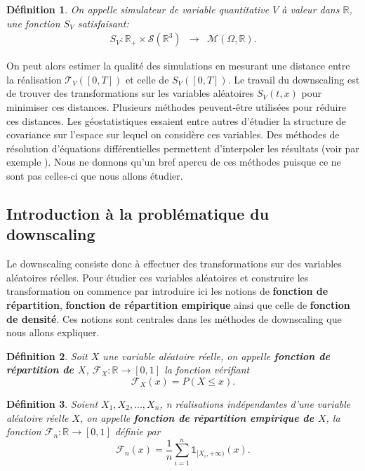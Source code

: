 \documentclass[a4paper,11pt]{article}
\numberwithin{equation}{section}
\newtheorem{definition}{Définition}
\begin{document}
\begin{definition}
	\label{simu_terre}
	On appelle simulateur de variable quantitative $V$ à valeur dans $\mathbb{R}$, une fonction $S_V$ satisfaisant:
	\begin{equation}
		\begin{array}{ccc}
			S_V: \mathbb{R}_{+}\times\mathcal{S}(\mathbb{R}^{3}) & \to & \mathcal{M}(\Omega,\mathbb{R}).
		\end{array}
	\end{equation}
\end{definition}
On peut alors estimer la qualité des simulations en mesurant une distance entre la réalisation $\mathcal{T}_V([0,T])$ et celle de $S_V([0,T])$. Le travail du downscaling est de trouver des transformations sur les variables aléatoires $S_V(t,x)$ pour minimiser ces distances. Plusieurs méthodes peuvent-être utilisées pour réduire ces distances. Les géostatistiques essaient entre autres d'étudier la structure de covariance sur l'espace sur lequel on considère ces variables. Des méthodes de résolution d'équations différentielles permettent d'interpoler les résultats (voir par exemple \cite{lindgren2011explicit}). Nous ne donnons qu'un bref apercu de ces méthodes puisque ce ne sont pas celles-ci que nous allons étudier.

\subsection{Introduction à la problématique du downscaling}
\label{ch:intro-dwnsc}
Le downscaling consiste donc à effectuer des transformations sur des variables aléatoires réelles. Pour étudier ces variables aléatoires et construire les transformation on commence par introduire ici les notions de \textbf{fonction de répartition}, \textbf{fonction de répartition empirique} ainsi que celle de \textbf{fonction de densité}. Ces notions sont centrales dans les méthodes de downscaling que nous allons expliquer.

\begin{definition}
	Soit $X$ une variable aléatoire réelle, on appelle \textbf{fonction de répartition de $X$}, $\mathcal{F}_{X}: \mathbb{R}\to [0,1]$ la fonction vérifiant
	\begin{equation}
		\mathcal{F}_{X}(x)=P(X\leq x).
	\end{equation}
\end{definition}

\begin{definition}
	Soient $X_1,X_2,...,X_n$, n réalisations indépendantes d'une variable aléatoire réelle $X$, on appelle \textbf{fonction de répartition empirique de $X$}, la fonction $\mathcal{F}_{n}:\mathbb{R}\to [0,1]$ définie par
	\begin{equation}
		\mathcal{F}_{n}(x)= \frac{1}{n}\sum_{i=1}^{n}\mathds{1}_{[X_i, +\infty )}(x).
	\end{equation}
\end{definition}
\end{document}
